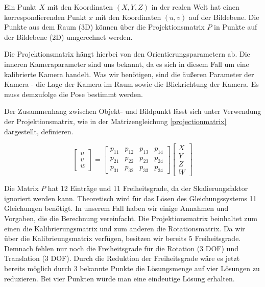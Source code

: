 \documentclass{ezb}
\begin{document}
Ein Punkt $X$ mit den Koordinaten $(X,Y,Z)$ in der realen Welt hat einen korrespondierenden Punkt $x$ mit den Koordinaten $(u,v)$ auf der Bildebene. Die Punkte aus dem Raum (3D) können über die Projektionsmatrix $P$ in Punkte auf der Bildebene (2D) umgerechnet werden.

Die Projektionsmatrix hängt hierbei von den Orientierungsparametern ab. Die inneren Kameraparameter sind uns bekannt, da es sich in diesem Fall um eine kalibrierte Kamera handelt. Was wir benötigen, sind die äußeren Parameter der Kamera - die Lage der Kamera im Raum sowie die Blickrichtung der Kamera. Es muss demzufolge die Pose bestimmt werden.

Der Zusammenhang zwischen Objekt- und Bildpunkt lässt sich unter Verwendung der Projektionsmatrix, wie in der Matrizengleichung \ref{projectionmatrix} dargestellt, definieren.

\begin{equation} \label{projectionmatrix}
\begin{bmatrix}
u \\
v \\
w 
\end{bmatrix}
=
\begin{bmatrix}
p_{11} & p_{12} & p_{13} & p_{14} \\
p_{21} & p_{22} & p_{23} & p_{24} \\
p_{31} & p_{32} & p_{33} & p_{34} 
\end{bmatrix}
\begin{bmatrix}
X \\
Y \\
Z \\
W
\end{bmatrix}
\end{equation}  

Die Matrix $P$ hat 12 Einträge und 11 Freiheitsgrade, da der Skalierungsfaktor ignoriert werden kann. Theoretisch wird für das Lösen des Gleichungssystems 11 Gleichungen benötigt. In unserem Fall haben wir einige Annahmen und Vorgaben, die die Berechnung vereinfacht. Die Projektionsmatrix beinhaltet zum einen die Kalibrierungsmatrix und zum anderen die Rotationsmatrix. Da wir über die Kalibrieungsmatrix verfügen, besitzen wir bereits 5 Freiheitsgrade. Demnach fehlen nur noch die Freiheitsgrade für die Rotation (3 DOF) und Translation (3 DOF). Durch die Reduktion der Freiheitsgrade wäre es jetzt bereits möglich durch 3 bekannte Punkte die Lösungsmenge auf vier Lösungen zu reduzieren. Bei vier Punkten würde man eine eindeutige Lösung erhalten.
\end{document}

